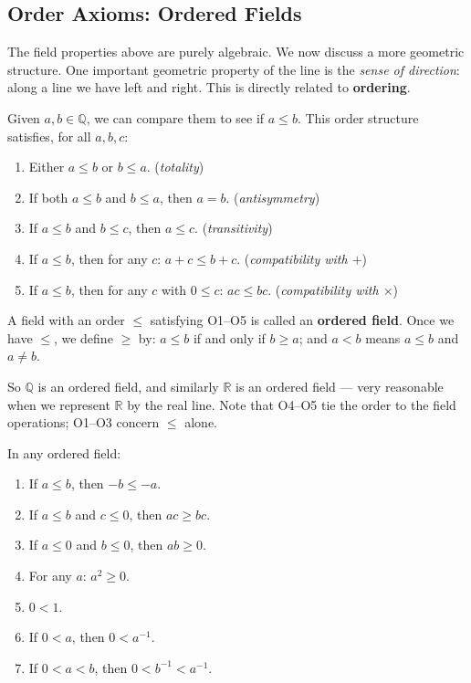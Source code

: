 \documentclass[11pt]{report}
\begin{document}
\subsection{Order Axioms: Ordered Fields}

The field properties above are purely algebraic. We now discuss a more geometric structure. One important geometric property of the line is the \emph{sense of direction}: along a line we have left and right. This is directly related to \textbf{ordering}.

\begin{defbox}
Given $a, b \in \mathbb{Q}$, we can compare them to see if $a \leq b$. This order structure satisfies, for all $a, b, c$:
\begin{enumerate}[label=\textbf{O\arabic*.}]
    \item Either $a \leq b$ or $b \leq a$. \hfill (\emph{totality})
    \item If both $a \leq b$ and $b \leq a$, then $a = b$. \hfill (\emph{antisymmetry})
    \item If $a \leq b$ and $b \leq c$, then $a \leq c$. \hfill (\emph{transitivity})
    \item If $a \leq b$, then for any $c$: $a + c \leq b + c$. \hfill (\emph{compatibility with $+$})
    \item If $a \leq b$, then for any $c$ with $0 \leq c$: $ac \leq bc$. \hfill (\emph{compatibility with $\times$})
\end{enumerate}
A field with an order $\leq$ satisfying O1--O5 is called an \textbf{ordered field}. Once we have $\leq$, we define $\geq$ by: $a \leq b$ if and only if $b \geq a$; and $a < b$ means $a \leq b$ and $a \neq b$.
\end{defbox}

So $\mathbb{Q}$ is an ordered field, and similarly $\mathbb{R}$ is an ordered field --- very reasonable when we represent $\mathbb{R}$ by the real line. Note that O4--O5 tie the order to the field operations; O1--O3 concern $\leq$ alone.

\begin{propbox}
In any ordered field:
\begin{enumerate}[label=(\alph*)]
    \item If $a \leq b$, then $-b \leq -a$.
    \item If $a \leq b$ and $c \leq 0$, then $ac \geq bc$.
    \item If $a \leq 0$ and $b \leq 0$, then $ab \geq 0$.
    \item For any $a$: $a^2 \geq 0$.
    \item $0 < 1$.
    \item If $0 < a$, then $0 < a^{-1}$.
    \item If $0 < a < b$, then $0 < b^{-1} < a^{-1}$.
\end{enumerate}
\end{propbox}
\end{document}
